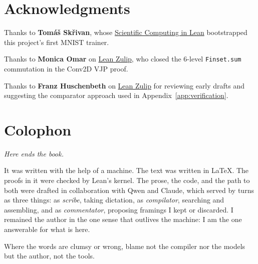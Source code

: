 \chapter*{Acknowledgments}

Thanks to \textbf{Tomáš Skřivan}, whose
\href{https://lecopivo.github.io/scientific-computing-lean/Working-with-Arrays/Tensor-Operations/}{Scientific Computing in Lean}
bootstrapped this project's first MNIST trainer.

\noindent Thanks to \textbf{Monica Omar} on
\href{https://leanprover.zulipchat.com/}{Lean Zulip}, who closed
the 6-level \texttt{Finset.sum} commutation in the Conv2D VJP
proof.

\noindent Thanks to \textbf{Franz Huschenbeth} on
\href{https://leanprover.zulipchat.com/}{Lean Zulip} for reviewing
early drafts and suggesting the comparator approach used in
Appendix~\ref{app:verification}.

\chapter*{Colophon}

\emph{Here ends the book.}

It was written with the help of a machine. The text was written in
LaTeX. The proofs in it were checked by Lean's kernel. The prose, the
code, and the path to both were drafted in collaboration with Qwen and
Claude, which served by turns as three things: as \emph{scribe}, taking
dictation, as \emph{compilator}, searching and assembling, and as
\emph{commentator}, proposing framings I kept or discarded. I remained
the author in the one sense that outlives the machine: I am the one
answerable for what is here.


\noindent Where the words are clumsy or wrong, blame not the compiler nor
the models but the author, not the tools.
